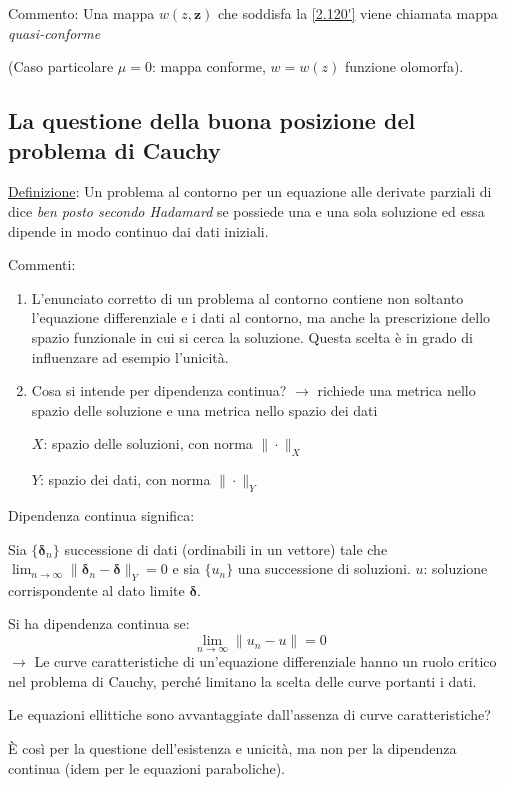 \documentclass[a4paper,11pt]{report}
\newcommand{\vect}[1]{\boldsymbol{#1}}
\newcommand{\z}{\boldsymbol{z}}
\begin{document}
Commento: Una mappa $w(z,\z)$ che soddisfa la \eqref{2.120'} viene chiamata mappa \emph{quasi-conforme}

(Caso particolare $\mu=0$: mappa conforme, $w=w(z)$ funzione olomorfa).

\subsection{La questione della buona posizione del problema di Cauchy}

\underline{Definizione}: Un problema al contorno per un equazione alle derivate parziali di dice \emph{ben posto secondo Hadamard} se possiede una e una sola soluzione ed essa dipende in modo continuo dai dati iniziali.

Commenti:
\begin{enumerate}[label=(\roman*)]
\item L'enunciato corretto di un problema al contorno contiene non soltanto l'equazione differenziale e i dati al contorno, ma anche la prescrizione dello spazio funzionale in cui si cerca la soluzione. Questa scelta \`e in grado di influenzare ad esempio l'unicit\`a.

\item Cosa si intende per dipendenza continua? $\rightarrow$ richiede una metrica nello spazio delle soluzione e una metrica nello spazio dei dati

$X$: spazio delle soluzioni, con norma $\| \cdot \|_X$

$Y$: spazio dei dati, con norma $\| \cdot \|_Y$
\end{enumerate}
Dipendenza continua significa:

Sia $\{\vect{\delta}_n\}$ successione di dati (ordinabili in un vettore) tale che  $\lim_{n\to\infty} \| \vect{\delta}_n - \vect{\delta}\|_Y=0$ e sia $\{u_n\}$ una successione di soluzioni. $u$: soluzione corrispondente al dato limite $\vect{\delta}$.

Si ha dipendenza continua se:
\[
\lim_{n\to \infty}\|u_n - u \|=0
\]
$\rightarrow$ Le curve caratteristiche di un'equazione differenziale hanno un ruolo critico nel problema di Cauchy, perch\'e limitano la scelta delle curve portanti i dati.

Le equazioni ellittiche sono avvantaggiate dall'assenza di curve caratteristiche?

\`E cos\`i per la questione dell'esistenza e unicit\`a, ma non per la dipendenza continua (idem per le equazioni paraboliche).

\smallskip
\end{document}
